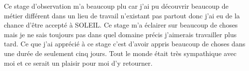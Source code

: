 





			
		
        Ce stage d'observation m'a beaucoup plu car j'ai pu découvrir beaucoup de métier différent dans un lieu de travail n'existant pas partout donc j'ai eu de la chance d'être accepté à SOLEIL. Ce stage m'a éclairer sur beaucoup de choses mais je ne sais toujours pas dans quel domaine précis j'aimerais travailler plus tard. Ce que j'ai apprécié à ce stage c'est d'avoir appris beaucoup de choses dans une durée de seulement cinq jours.
        Tout le monde était très sympathique avec moi et ce serait un plaisir pour moi d'y retourner.
